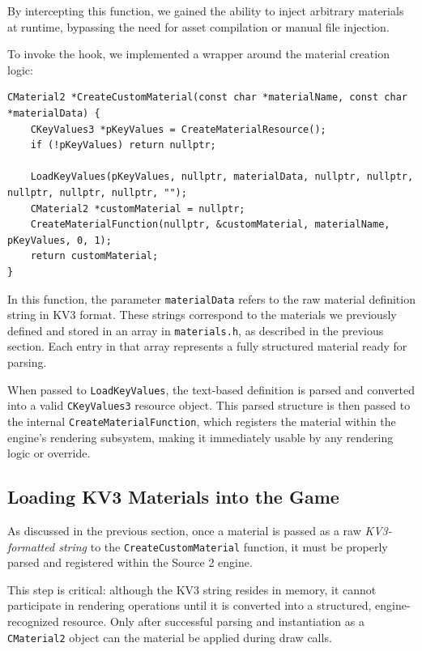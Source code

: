 By intercepting this function, we gained the ability to inject arbitrary materials at runtime, bypassing the need for asset compilation or manual file injection.

To invoke the hook, we implemented a wrapper around the material creation logic:

\begin{lstlisting}[style=cppstyle, caption={Creating a Custom Material in Memory}]
CMaterial2 *CreateCustomMaterial(const char *materialName, const char *materialData) {
    CKeyValues3 *pKeyValues = CreateMaterialResource();
    if (!pKeyValues) return nullptr;

    LoadKeyValues(pKeyValues, nullptr, materialData, nullptr, nullptr, nullptr, nullptr, nullptr, "");
    CMaterial2 *customMaterial = nullptr;
    CreateMaterialFunction(nullptr, &customMaterial, materialName, pKeyValues, 0, 1);
    return customMaterial;
}
\end{lstlisting}

In this function, the parameter \texttt{materialData} refers to the raw material definition string in KV3 format. These strings correspond to the materials we previously defined and stored in an array in \texttt{materials.h}, as described in the previous section. Each entry in that array represents a fully structured material ready for parsing.

When passed to \texttt{LoadKeyValues}, the text-based definition is parsed and converted into a valid \texttt{CKeyValues3} resource object. This parsed structure is then passed to the internal \texttt{CreateMaterialFunction}, which registers the material within the engine’s rendering subsystem, making it immediately usable by any rendering logic or override.

\subsection{Loading KV3 Materials into the Game}

As discussed in the previous section, once a material is passed as a raw \textit{KV3-formatted string} to the \texttt{CreateCustomMaterial} function, it must be properly parsed and registered within the Source 2 engine.

This step is critical: although the KV3 string resides in memory, it cannot participate in rendering operations until it is converted into a structured, engine-recognized resource. Only after successful parsing and instantiation as a \texttt{CMaterial2} object can the material be applied during draw calls.


